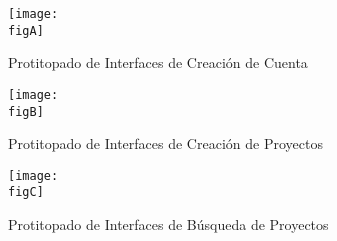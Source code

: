 	\restoregeometry %


	\clearpage
	\listoffigures



	\clearpage
	\vspace*{-16pt}
	\begin{center}
		{\textbf{\huge \theTitle}}
	\end{center}
	\vspace*{8pt}


	\begin{figure}[h]
		\centering
		\texttt{[image: \\figA]}
		\caption{Protitopado de Interfaces de Creación de Cuenta}
	\end{figure}

	\begin{figure}[h]
		\centering
		\texttt{[image: \\figB]}
		\caption{Protitopado de Interfaces de Creación de Proyectos}
	\end{figure}

	\begin{figure}[h]
		\centering
		\texttt{[image: \\figC]}
		\caption{Protitopado de Interfaces de Búsqueda de Proyectos}
	\end{figure}

